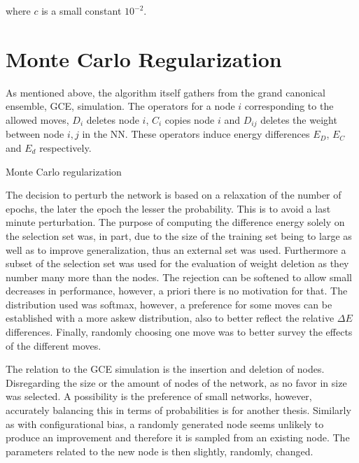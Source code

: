 where $c$ is a small constant $10^{-2}$.

\section{Monte Carlo Regularization}

As mentioned above, the algorithm itself gathers from the grand canonical ensemble, GCE, simulation. The operators for a node $i$ corresponding to the allowed moves, $D_i$ deletes node $i$, $C_i$ copies node $i$ and $D_{ij}$ deletes the weight between node $i,j$ in the NN. These operators induce energy differences $E_D$, $E_C$ and $E_d$ respectively. 

\begin{algorithm}
    \caption{Monte Carlo regularization}
    \begin{algorithmic}[1]
        \EndIf
    \State {}
    \end{algorithmic}
\end{algorithm}

The decision to perturb the network is based on a relaxation of the number of epochs, the later the epoch the lesser the probability. This is to avoid a last minute perturbation. The purpose of computing the difference energy solely on the selection set was, in part, due to the size of the training set being to large as well as to improve generalization, thus an external set was used. Furthermore a subset of the selection set was used for the evaluation of weight deletion as they number many more than the nodes. The rejection can be softened to allow small decreases in performance, however, a priori there is no motivation for that. The distribution used was softmax, however, a preference for some moves can be established with a more askew distribution, also to better reflect the relative $\Delta E$ differences. Finally, randomly choosing one move was to better survey the effects of the different moves. 

The relation to the GCE simulation is the insertion and deletion of nodes. Disregarding the size or the amount of nodes of the network, as no favor in size was selected. A possibility is the preference of small networks, however, accurately balancing this in terms of probabilities is for another thesis. Similarly as with configurational bias, a randomly generated node seems unlikely to produce an improvement and therefore it is sampled from an existing node. The parameters related to the new node is then slightly, randomly, changed. 